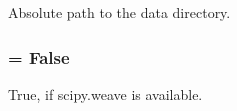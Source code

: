Absolute path to the data directory. 

\hypertarget{namespacesmc_fa23f48b546729c612828f8c434748d3}{
\subsubsection[{WEAVE}]{ = False}}
\label{namespacesmc_fa23f48b546729c612828f8c434748d3}


True, if scipy.weave is available. 

